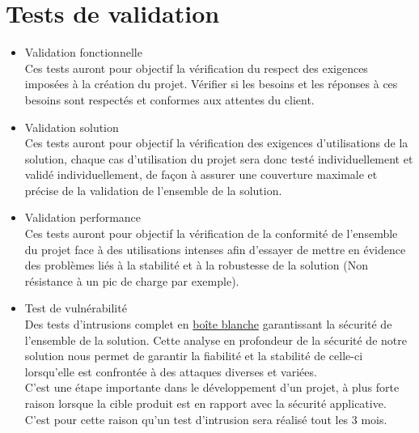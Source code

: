 \section{Tests de validation}
\begin{itemize}
\item Validation fonctionnelle\\
Ces tests auront pour objectif la vérification du respect des exigences imposées à la création du projet. Vérifier si les besoins et les réponses à ces besoins sont respectés et conformes aux attentes du client.\\
\item Validation solution\\
Ces tests auront pour objectif la vérification des exigences d’utilisations de la solution, chaque cas d’utilisation du projet sera donc testé individuellement et validé individuellement, de façon à assurer une couverture maximale et précise de la validation de l’ensemble de la solution.\\
\item Validation performance\\
Ces tests auront pour objectif la vérification de la conformité de l’ensemble du projet face à des utilisations intenses afin d’essayer de mettre en évidence des problèmes liés à la stabilité et à la robustesse de la solution (Non résistance à un pic de charge par exemple).\\
\item Test de vulnérabilité\\
Des tests d'intrusions complet en \href{http://fr.wikipedia.org/wiki/Bo\%C3\%AEte_blanche}{boîte blanche} garantissant la sécurité de l'ensemble de la solution.
Cette analyse en profondeur de la sécurité de notre solution nous permet de garantir la fiabilité et la stabilité de celle-ci lorsqu’elle est confrontée à des attaques diverses et variées.\\
C'est une étape importante dans le développement d'un projet, à plus forte raison lorsque la cible produit est en rapport avec la sécurité applicative. C'est pour cette raison qu'un test d'intrusion sera réalisé tout les 3 mois.\\

\end{itemize}